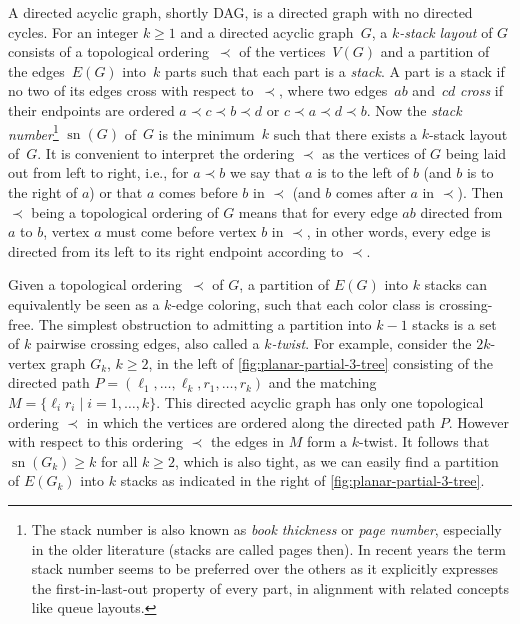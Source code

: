 \documentclass{theoretics}
\DeclareMathOperator{\sn}{sn}
\begin{document}
A directed acyclic graph, shortly DAG, is a directed graph with no directed cycles.
For an integer $k \geq 1$ and a directed acyclic graph~$G$, a \emph{$k$-stack layout} of $G$ consists of a topological ordering~$\prec$ of the vertices~$V(G)$ and a partition of the edges~$E(G)$ into~$k$ parts such that each part is a \emph{stack}.
A part is a stack if no two of its edges cross with respect to~$\prec$, where two edges~$ab$ and~$cd$ \emph{cross} if their endpoints are ordered $a \prec c \prec b \prec d$ or $c \prec a \prec d \prec b$.
Now the \emph{stack number}\footnote{
    The stack number is also known as \emph{book thickness} or \emph{page number}, especially in the older literature (stacks are called pages then).
    In recent years the term stack number seems to be preferred over the others as it explicitly expresses the first-in-last-out property of every part, in alignment with related concepts like queue layouts.
} $\sn(G)$ of~$G$ is the minimum~$k$ such that there exists a $k$-stack layout of~$G$.
It is convenient to interpret the ordering $\prec$ as the vertices of $G$ being laid out from left to right, i.e., for $a \prec b$ we say that $a$ is to the left of $b$ (and $b$ is to the right of $a$) or that $a$ comes before $b$ in $\prec$ (and $b$ comes after $a$ in $\prec$).
Then $\prec$ being a topological ordering of $G$ means that for every edge $ab$ directed from $a$ to $b$, vertex $a$ must come before vertex $b$ in $\prec$, in other words, every edge is directed from its left to its right endpoint according to $\prec$.

Given a topological ordering~$\prec$ of $G$, a partition of $E(G)$ into $k$ stacks can equivalently be seen as a $k$-edge coloring, such that each color class is crossing-free.
The simplest obstruction to admitting a partition into $k-1$ stacks is a set of $k$ pairwise crossing edges, also called a \emph{$k$-twist}.
For example, consider the $2k$-vertex graph $G_k$, $k \geq 2$, in the left of \cref{fig:planar-partial-3-tree} consisting of the directed path $P = (\ell_1,\ldots,\ell_k,r_1,\ldots,r_k)$ and the matching $M = \{\ell_i r_i \mid i=1,\ldots,k\}$.
This directed acyclic graph has only one topological ordering $\prec$ in which the vertices are ordered along the directed path $P$.
However with respect to this ordering $\prec$ the edges in $M$ form a $k$-twist.
It follows that $\sn(G_k) \geq k$ for all $k \geq 2$, which is also tight, as we can easily find a partition of $E(G_k)$ into $k$ stacks as indicated in the right of \cref{fig:planar-partial-3-tree}.
\end{document}
